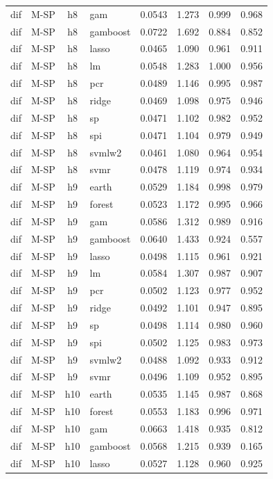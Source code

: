 \begin{ThreePartTable}
\begin{longtable}[t]{llclcccc}
dif & M-SP & h8 & gam & 0.0543 & 1.273 & 0.999 & 0.968\\
dif & M-SP & h8 & gamboost & 0.0722 & 1.692 & 0.884 & 0.852\\
dif & M-SP & h8 & lasso & 0.0465 & 1.090 & 0.961 & 0.911\\
dif & M-SP & h8 & lm & 0.0548 & 1.283 & 1.000 & 0.956\\
dif & M-SP & h8 & pcr & 0.0489 & 1.146 & 0.995 & 0.987\\
dif & M-SP & h8 & ridge & 0.0469 & 1.098 & 0.975 & 0.946\\
dif & M-SP & h8 & sp & 0.0471 & 1.102 & 0.982 & 0.952\\
dif & M-SP & h8 & spi & 0.0471 & 1.104 & 0.979 & 0.949\\
dif & M-SP & h8 & svmlw2 & 0.0461 & 1.080 & 0.964 & 0.954\\
dif & M-SP & h8 & svmr & 0.0478 & 1.119 & 0.974 & 0.934\\
\addlinespace
dif & M-SP & h9 & earth & 0.0529 & 1.184 & 0.998 & 0.979\\
dif & M-SP & h9 & forest & 0.0523 & 1.172 & 0.995 & 0.966\\
dif & M-SP & h9 & gam & 0.0586 & 1.312 & 0.989 & 0.916\\
dif & M-SP & h9 & gamboost & 0.0640 & 1.433 & 0.924 & 0.557\\
dif & M-SP & h9 & lasso & 0.0498 & 1.115 & 0.961 & 0.921\\
dif & M-SP & h9 & lm & 0.0584 & 1.307 & 0.987 & 0.907\\
dif & M-SP & h9 & pcr & 0.0502 & 1.123 & 0.977 & 0.952\\
dif & M-SP & h9 & ridge & 0.0492 & 1.101 & 0.947 & 0.895\\
dif & M-SP & h9 & sp & 0.0498 & 1.114 & 0.980 & 0.960\\
dif & M-SP & h9 & spi & 0.0502 & 1.125 & 0.983 & 0.973\\
dif & M-SP & h9 & svmlw2 & 0.0488 & 1.092 & 0.933 & 0.912\\
dif & M-SP & h9 & svmr & 0.0496 & 1.109 & 0.952 & 0.895\\
\addlinespace
dif & M-SP & h10 & earth & 0.0535 & 1.145 & 0.987 & 0.868\\
dif & M-SP & h10 & forest & 0.0553 & 1.183 & 0.996 & 0.971\\
dif & M-SP & h10 & gam & 0.0663 & 1.418 & 0.935 & 0.812\\
dif & M-SP & h10 & gamboost & 0.0568 & 1.215 & 0.939 & 0.165\\
dif & M-SP & h10 & lasso & 0.0527 & 1.128 & 0.960 & 0.925\\

\end{longtable}
\end{ThreePartTable}
